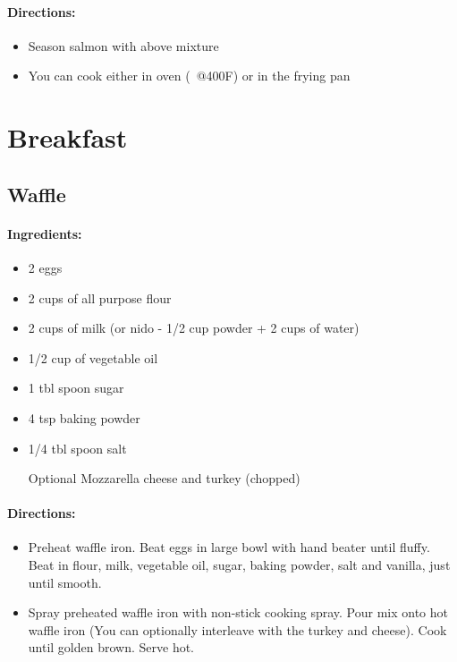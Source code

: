 \documentclass{article}
\begin{document}
\paragraph{Directions:}
\begin{itemize}
    \item Season salmon with above mixture
    \item You can cook either in oven (~@400F) or in the frying pan
\end{itemize}

\section{Breakfast}


\subsection{Waffle}

\paragraph{Ingredients:}
\begin{itemize}
    \item 2 eggs
    \item 2 cups of all purpose flour
    \item 2 cups of milk (or nido - 1/2 cup powder + 2 cups of water)
    \item 1/2 cup of vegetable oil
    \item 1 tbl spoon sugar
    \item 4 tsp baking powder
    \item 1/4 tbl spoon salt
    \item [Optional] Mozzarella cheese and turkey (chopped)
\end{itemize}

\paragraph{Directions:}
\begin{itemize}
    \item Preheat waffle iron. Beat eggs in large bowl with hand beater until fluffy. Beat in flour, milk, vegetable oil, sugar, baking powder, salt and vanilla, just until smooth.
    \item Spray preheated waffle iron with non-stick cooking spray. Pour mix onto hot waffle iron (You can optionally interleave with the turkey and cheese). Cook until golden brown. Serve hot.
\end{itemize}
\end{document}
